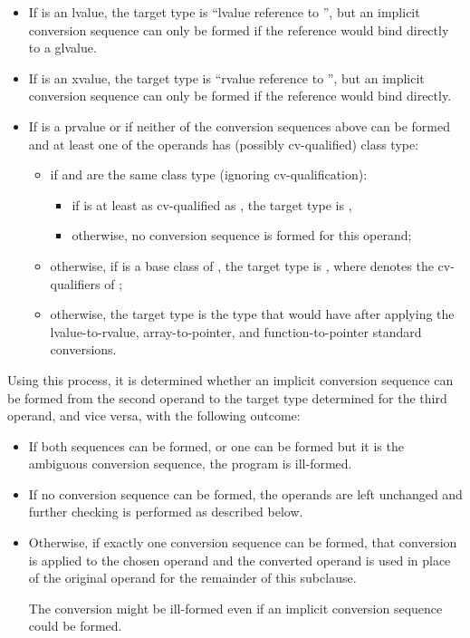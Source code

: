 \begin{itemize}
\item If  is an lvalue, the target type is
``lvalue reference to '',
but an implicit conversion sequence can only be formed
if the reference would bind directly
to a glvalue.

\item If  is an xvalue, the target type is
``rvalue reference to '',
but an implicit conversion sequence can only be formed
if the reference would bind directly.

\item If  is a prvalue or if neither of the conversion sequences above can be
formed and at least one of the operands has (possibly cv-qualified) class type:
\begin{itemize}
\item if  and  are the same class type
(ignoring cv-qualification):
  \begin{itemize}
  \item
  if  is at least as cv-qualified as ,
  the target type is ,
  \item
  otherwise, no conversion sequence is formed for this operand;
  \end{itemize}

\item otherwise, if  is a base class of ,
the target type is  , where 
denotes the cv-qualifiers of ;

\item otherwise, the target type is the type that  would have
after applying the
lvalue-to-rvalue,
array-to-pointer, and
function-to-pointer
standard conversions.
\end{itemize}
\end{itemize}

Using this process, it is determined whether an implicit conversion
sequence can be formed from the second operand
to the target type determined for the third operand, and vice versa,
with the following outcome:
\begin{itemize}
\item If both sequences can be formed, or one can be formed but it is the
ambiguous conversion sequence, the program is ill-formed.
\item If no conversion sequence can be formed, the operands are left unchanged
and further checking is performed as described below.
\item Otherwise, if exactly one conversion sequence can be formed,
that conversion is applied to the chosen operand
and the converted operand is used in place of the original operand for
the remainder of this subclause.
\begin{note}
The conversion might be ill-formed even if an implicit conversion
sequence could be formed.
\end{note}
\end{itemize}

